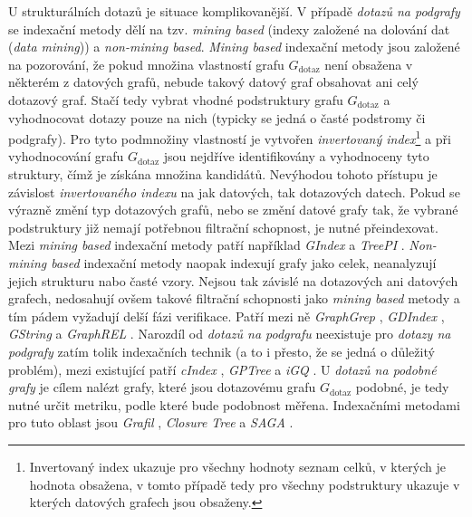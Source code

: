 U strukturálních dotazů je situace komplikovanější. V případě \textit{dotazů na podgrafy} se indexační metody dělí na tzv. \textit{mining based} (indexy založené na dolování dat (\textit{data mining})) a \textit{non-mining based}. \textit{Mining based} indexační metody jsou založené na pozorování, že pokud množina vlastností grafu \textit{$G_\mathrm{dotaz}$} není obsažena v některém z datových grafů, nebude takový datový graf obsahovat ani celý dotazový graf. Stačí tedy vybrat vhodné podstruktury grafu \textit{$G_\mathrm{dotaz}$} a vyhodnocovat dotazy pouze na nich (typicky se jedná o časté podstromy či podgrafy). Pro tyto podmnožiny vlastností je vytvořen
\textit{invertovaný index}\footnote{Invertovaný index ukazuje pro všechny hodnoty seznam celků, v kterých je hodnota obsažena, v tomto případě tedy pro všechny podstruktury ukazuje v kterých datových grafech jsou obsaženy.} a při vyhodnocování grafu \textit{$G_\mathrm{dotaz}$} jsou nejdříve identifikovány a vyhodnoceny tyto struktury, čímž je získána množina kandidátů. Nevýhodou tohoto přístupu je závislost \textit{invertovaného indexu} na jak datových, tak dotazových datech. Pokud se výrazně změní typ dotazových grafů, nebo se změní datové grafy tak, že vybrané podstruktury již nemají potřebnou filtrační schopnost, je nutné přeindexovat. Mezi \textit{mining based} indexační metody patří například \textit{GIndex} \cite{Yan04} a \textit{TreePI} \cite{Zhang07}.
\textit{Non-mining based} indexační metody naopak indexují grafy jako celek, neanalyzují jejich strukturu nabo časté vzory. Nejsou tak závislé na dotazových ani datových grafech, nedosahují ovšem takové filtrační schopnosti jako \textit{mining based} metody a tím pádem vyžadují delší fázi verifikace. Patří mezi ně \textit{GraphGrep} \cite{Giugno02}, \textit{GDIndex} \cite{Williams07}, \textit{GString} \cite{Jiang07} a
\textit{GraphREL} \cite{Sakr09}. Narozdíl od \textit{dotazů na podgrafu} neexistuje pro \textit{dotazy na podgrafy} zatím tolik indexačních technik (a to i přesto, že se jedná o důležitý problém), mezi existující patří \textit{cIndex} \cite{Chen07}, \textit{GPTree} \cite{Zhang09} a \textit{iGQ} \cite{Wang16}. U \textit{dotazů na podobné grafy} je cílem nalézt grafy, které jsou dotazovému grafu \textit{$G_\mathrm{dotaz}$} podobné, je tedy nutné určit metriku, podle které bude podobnost měřena. Indexačními metodami pro tuto oblast jsou \textit{Grafil} \cite{Yan05}, \textit{Closure Tree} \cite{He06} a \textit{SAGA} \cite{Tian07}.


